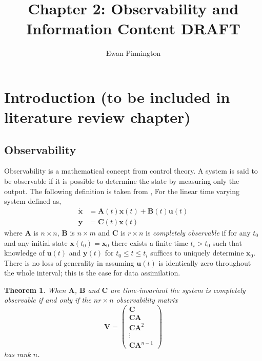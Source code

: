 \documentclass[11pt]{article}
\title{Chapter 2: Observability and Information Content {\color{red}DRAFT}}
\author{Ewan Pinnington}
\newtheorem{theorem}{Theorem}[section]
\begin{document}
\maketitle

\section{Introduction (to be included in literature review chapter)}

\subsection{Observability}

Observability is a mathematical concept from control theory. A system is said to be observable if it is possible to determine the state by measuring only the output. The following definition is taken from \citet{barnett1985introduction}, For the linear time varying system defined as,
\begin{align}
\dot{\textbf{x}} &= \textbf{A}(t)\textbf{x}(t) +\textbf{B}(t)\textbf{u}(t) \\
\textbf{y} &= \textbf{C}(t)\textbf{x}(t)
\end{align}
where $\textbf{A}$ is $n \times n$, $\textbf{B}$ is $n \times m$ and $\textbf{C}$ is $r \times n$ is \textit{completely observable} if for any $t_0$ and any initial state $\textbf{x}(t_0) = \textbf{x}_0$ there exists a finite time $t_i > t_0$ such that knowledge of $\textbf{u}(t)$ and $\textbf{y}(t)$ for $t_0 \leq t \leq t_i$ suffices to uniquely determine $\textbf{x}_0$. There is no loss of generality in assuming $\textbf{u}(t)$ is identically zero throughout the whole interval; this is the case for data assimilation.

\begin{theorem} \label{thm:observable}
When $\textbf{A}$, $\textbf{B}$ and $\textbf{C}$ are time-invariant the system is completely observable if and only if the $nr \times n$ observability matrix
\begin{equation}
\mathbf{V}=
\begin{pmatrix}
\mathbf{C} \\
\mathbf{C}\mathbf{A}\\
\mathbf{C}\mathbf{A}^{2}\\
\vdots \\
\mathbf{C}\mathbf{A}^{n-1}
\end{pmatrix}
\end{equation}
has rank $n$.
\end{theorem}
\end{document}
